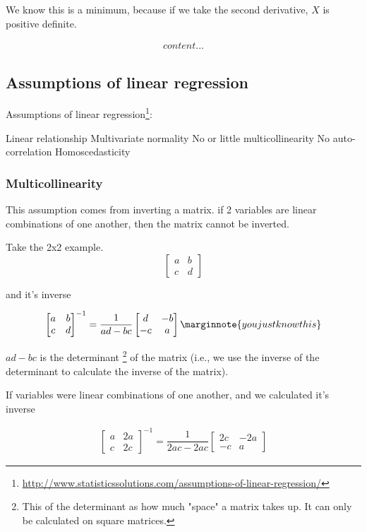 \documentclass[10pt,letterpaper,twoside]{article}
\begin{document}
We know this is a minimum, because if we take the second derivative,
$X$ is positive definite.

\begin{align}
    content...
\end{align}

\subsection{Assumptions of linear regression}

Assumptions of linear regression\footnote{\url{http://www.statisticssolutions.com/assumptions-of-linear-regression/}}:

Linear relationship
Multivariate normality
No or little multicollinearity
No auto-correlation
Homoscedasticity


\subsubsection{Multicollinearity}

This assumption comes from inverting a matrix.
if 2 variables are linear combinations of one another, then the matrix cannot be inverted.

Take the 2x2 example.
\[
\begin{bmatrix}
    a & b \\
    c & d
\end{bmatrix}
\]

and it's inverse

\begin{align}
    \begin{bmatrix}
    a & b \\
    c & d
    \end{bmatrix}^{-1}
    =
    \dfrac{1}{ad - bc}
    \begin{bmatrix}
    d & -b \\
    -c & a
    \end{bmatrix}    \marginnote{you just know this}
\end{align}

$ad - bc$ is the determinant
\footnote{This of the determinant as how much "space" a matrix takes up.
    It can only be calculated on square matrices.}
of the matrix
(i.e., we use the inverse of the determinant to calculate the inverse of the matrix).

If variables were linear combinations of one another, and we calculated it's inverse

\begin{align}
    \begin{bmatrix}
    a & 2a \\
    c & 2c
    \end{bmatrix}^{-1}
    =
    \dfrac{1}{2ac - 2ac}
    \begin{bmatrix}
    2c & -2a \\
    -c & a
    \end{bmatrix}
\end{align}
\end{document}
